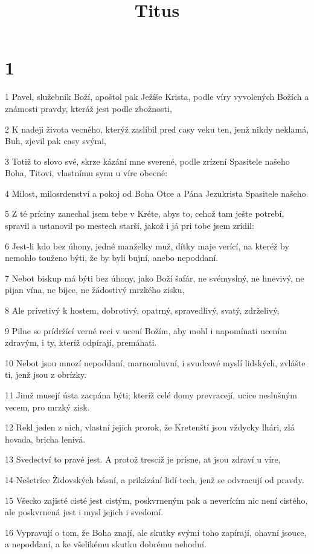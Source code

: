 

\title{Titus}

\chapter{1}

\par 1 Pavel, služebník Boží, apoštol pak Ježíše Krista, podle víry vyvolených Božích a známosti pravdy, kteráž jest podle zbožnosti,
\par 2 K nadeji života vecného, kterýž zaslíbil pred casy veku ten, jenž nikdy neklamá, Buh, zjevil pak casy svými,
\par 3 Totiž to slovo své, skrze kázání mne sverené, podle zrízení Spasitele našeho Boha, Titovi, vlastnímu synu u víre obecné:
\par 4 Milost, milosrdenství a pokoj od Boha Otce a Pána Jezukrista Spasitele našeho.
\par 5 Z té príciny zanechal jsem tebe v Kréte, abys to, cehož tam ješte potrebí, spravil a ustanovil po mestech starší, jakož i já pri tobe jsem zrídil:
\par 6 Jest-li kdo bez úhony, jedné manželky muž, dítky maje verící, na kteréž by nemohlo touženo býti, že by byli bujní, anebo nepoddaní.
\par 7 Nebot biskup má býti bez úhony, jako Boží šafár, ne svémyslný, ne hnevivý, ne pijan vína, ne bijce, ne žádostivý mrzkého zisku,
\par 8 Ale prívetivý k hostem, dobrotivý, opatrný, spravedlivý, svatý, zdrželivý,
\par 9 Pilne se prídržící verné reci v ucení Božím, aby mohl i napomínati ucením zdravým, i ty, kteríž odpírají, premáhati.
\par 10 Nebot jsou mnozí nepoddaní, marnomluvní, i svudcové myslí lidských, zvlášte ti, jenž jsou z obrízky.
\par 11 Jimž musejí ústa zacpána býti; kteríž celé domy prevracejí, ucíce neslušným vecem, pro mrzký zisk.
\par 12 Rekl jeden z nich, vlastní jejich prorok, že Kretenští jsou vždycky lhári, zlá hovada, bricha lenivá.
\par 13 Svedectví to pravé jest. A protož tresciž je prísne, at jsou zdraví u víre,
\par 14 Nešetríce Židovských básní, a prikázání lidí tech, jenž se odvracují od pravdy.
\par 15 Všecko zajisté cisté jest cistým, poskvrneným pak a neverícím nic není cistého, ale poskvrnená jest i mysl jejich i svedomí.
\par 16 Vypravují o tom, že Boha znají, ale skutky svými toho zapírají, ohavní jsouce, a nepoddaní, a ke všelikému skutku dobrému nehodní.

